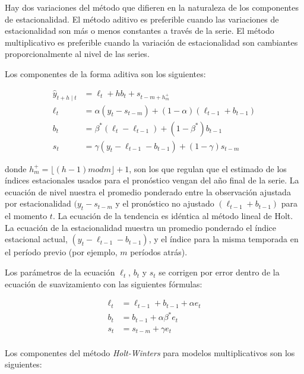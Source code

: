 \begin{spacing}{1.5}
Hay dos variaciones del método que difieren en la naturaleza de los componentes de estacionalidad. El método aditivo es preferible cuando las variaciones de estacionalidad son más o menos constantes a través de la serie. El método multiplicativo es preferible cuando la variación de estacionalidad son cambiantes proporcionalmente al nivel de las series. 

Los componentes de la forma aditiva son los siguientes:

\begin{equation} 
\begin{split}
	\hat{y}_{t+h \mid t} & = \ell_{t} + hb_{t} + s_{t-m+h_{m}^{+}} \\
 	\ell_{t} & = \alpha(y_{t} - s_{t-m}) + (1 - \alpha)(\ell_{t-1} + b_{t-1}) \\
    b_{t} & = \beta^{*}(\ell_{t} - \ell_{t-1}) + (1 - \beta^{*})b_{t-1} \\
    s_{t} & = \gamma(y_{t} - \ell_{t-1} - b_{t-1}) + (1-\gamma)s_{t-m}
\end{split}
\end{equation}

donde $h_{m}^{+} = \lfloor (h-1) mod m \rfloor + 1$, son los que regulan que el estimado de los índices estacionales usados para el pronóstico vengan del año final de la serie. La ecuación de nivel nuestra el promedio ponderado entre la observación ajustada por estacionalidad $(y_{t} - s_{t-m}$ y el pronóstico no ajustado $(\ell_{t-1} + b_{t-1})$ para el momento $t$. La ecuación de la tendencia es idéntica al método lineal de Holt. La ecuación de la estacionalidad muestra un promedio ponderado el índice estacional actual, $(y_{t} - \ell_{t-1} - b_{t-1})$, y el índice para la misma temporada en el período previo (por ejemplo, $m$ períodos atrás).

Los parámetros de la ecuación $\ell_{t}$, $b_{t}$ y $s_{t}$ se corrigen por error dentro de la ecuación de suavizamiento con las siguientes fórmulas:

\begin{equation}
\begin{split}
	\ell_{t} & = \ell_{t-1} + b_{t-1} + \alpha e_{t} \\
    b_{t} & = b_{t-1} + \alpha \beta^{*} e_{t} \\
    s_{t} & = s_{t-m} + \gamma e_{t} \\
\end{split}
\end{equation}

Los componentes del método \emph{Holt-Winters} para modelos multiplicativos son los siguientes:


\end{spacing}

